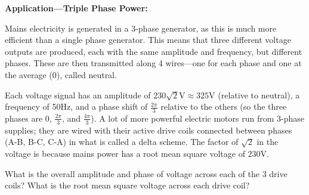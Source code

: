 \documentclass{article}
\begin{document}
\textbf{Application---Triple Phase Power:}

\vspace{5mm}

Mains electricity is generated in a 3-phase generator, as this is much more efficient than a single phase generator. This means that three different voltage outputs are produced, each with the same amplitude and frequency, but different phases. These are then transmitted along 4 wires---one for each phase and one at the average (0), called neutral.

Each voltage signal has an amplitude of $230\sqrt{2}\mathrm{V}\approx325\mathrm{V}$ (relative to neutral), a frequency of 50Hz, and a phase shift of $\frac{2\pi}{3}$ relative to the others (so the three phases are $0$, $\frac{2\pi}{3}$, and $\frac{4\pi}{3}$). A lot of more powerful electric motors run from 3-phase supplies; they are wired with their active drive coils connected between phases (A-B, B-C, C-A) in what is called a delta scheme. The factor of $\sqrt{2}$ in the voltage is because mains power has a root mean square voltage of $230\mathrm{V}$.

What is the overall amplitude and phase of voltage across each of the 3 drive coils? What is the root mean square voltage across each drive coil?

\begin{center}
\end{center}
\end{document}
